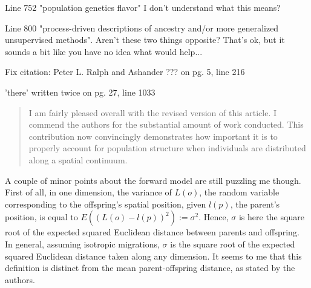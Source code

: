 \begin{point}{Line 752 "population genetics flavor"}
I don't understand what this means?
\end{point}


\begin{point}{Line 800}
"process-driven descriptions of ancestry and/or more generalized unsupervised methods". Aren't these two things opposite? That's ok, but it sounds a bit like you have no idea what would help...
\end{point}



\begin{point}{}
 Fix citation: Peter L. Ralph and Ashander ??? on pg. 5, line 216
\end{point}


\begin{point}{}
'there' written twice on pg. 27, line 1033
\end{point}







\begin{quote}
I am fairly pleased overall with the revised version of this article. I commend the authors for the substantial amount of work conducted. This contribution now convincingly demonstrates how important it is to properly account for population structure when individuals are distributed along a spatial continuum.
\end{quote}

\begin{point}{}
A couple of minor points about the forward model are still puzzling me though. First of all, in one dimension, the variance of $L(o)$, the random variable corresponding to the offspring's spatial position, given $l(p)$, the parent's position, is equal to $E((L(o)-l(p))^2):=\sigma^2$. Hence, $\sigma$ is here the square root of the expected squared Euclidean distance between parents and offspring. In general, assuming isotropic migrations, $\sigma$ is the square root of the expected squared Euclidean distance taken along any dimension. It seems to me that this definition is distinct from the mean parent-offspring distance, as stated by the authors.
\end{point}

